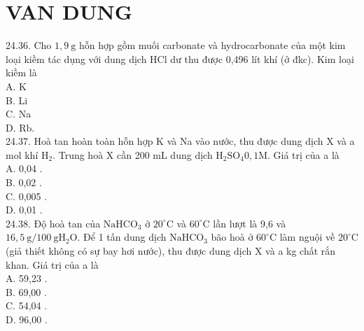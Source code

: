 \documentclass[10pt]{article}
\begin{document}
\section*{VAN DUNG}
24.36. Cho $1,9 \mathrm{~g}$ hỗn hợp gồm muối carbonate và hydrocarbonate của một kim loại kiềm tác dụng với dung dịch HCl dư thu được 0,496 lít khí (ở đkc). Kim loại kiềm là\\
A. K\\
B. Li\\
C. Na\\
D. Rb.\\
24.37. Hoà tan hoàn toàn hỗn hợp K và Na vào nước, thu được dung dịch X và a mol khí $\mathrm{H}_{2}$. Trung hoà X cần 200 mL dung dịch $\mathrm{H}_{2} \mathrm{SO}_{4} 0,1 \mathrm{M}$. Giá trị của a là\\
A. 0,04 .\\
B. 0,02 .\\
C. 0,005 .\\
D. 0,01 .\\
24.38. Độ hoà tan của $\mathrm{NaHCO}_{3}$ ở $20^{\circ} \mathrm{C}$ và $60^{\circ} \mathrm{C}$ lần lượt là 9,6 và $16,5 \mathrm{~g} / 100 \mathrm{~g} \mathrm{H}_{2} \mathrm{O}$. Để 1 tấn dung dịch $\mathrm{NaHCO}_{3}$ bão hoà ở $60^{\circ} \mathrm{C}$ làm nguội về $20^{\circ} \mathrm{C}$ (giả thiết không có sự bay hơi nước), thu được dung dịch X và a kg chất rắn khan. Giá trị của a là\\
A. 59,23 .\\
B. 69,00 .\\
C. 54,04 .\\
D. 96,00 .
\end{document}
